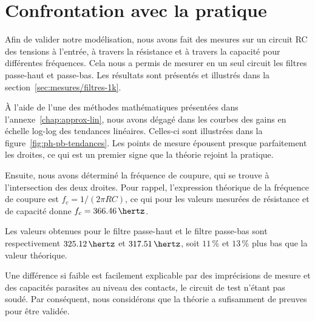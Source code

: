 \section{Confrontation avec la pratique}
\label{sec:filtres/confront}

Afin de valider notre modélisation,
nous avons fait des mesures sur un circuit RC
des tensions à l'entrée, à travers la résistance
et à travers la capacité pour différentes fréquences.
Cela nous a permis de mesurer en un seul circuit
les filtres passe-haut et passe-bas.
Les résultats sont présentés et illustrés
dans la section~\ref{sec:mesures/filtres-1k}.

À l'aide de l'une des méthodes mathématiques présentées dans
l'annexe~\ref{chap:approx-lin},
nous avons dégagé dans les courbes des gains en échelle log-log
des tendances linéaires.
Celles-ci sont illustrées dans la figure~\ref{fig:ph-pb-tendances}.
Les points de mesure épousent presque parfaitement les droites,
ce qui est un premier signe que la théorie rejoint la pratique.

Ensuite, nous avons déterminé la fréquence de coupure,
qui se trouve à l'intersection des deux droites.
Pour rappel, l'expression théorique de la fréquence de coupure est
$f_c=1/(2\pi RC)$, ce qui pour les valeurs mesurées de résistance et
de capacité donne $f_c=366.46\,\hertz$.

Les valeurs obtenues pour le filtre passe-haut et le filtre passe-bas
sont respectivement $325.12\,\hertz$ et $317.51\,\hertz$,
soit $11\,\%$ et $13\,\%$ plus bas que la valeur théorique.

Une différence si faible est facilement explicable par des imprécisions
de mesure et des capacités parasites au niveau des contacts,
le circuit de test n'étant pas soudé.
Par conséquent, nous considérons que la théorie a sufisamment de preuves
pour être validée.
